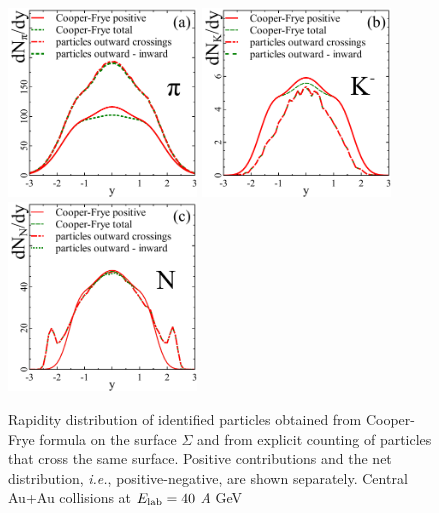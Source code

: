 \begin{figure}[htp]
\includegraphics[width=5cm]{plots/cooper_frye/E40pi.pdf}
\includegraphics[width=5cm]{plots/cooper_frye/E40Kmi.pdf}
\includegraphics[width=5cm]{plots/cooper_frye/E40N.pdf}
\caption{ Rapidity distribution of identified particles
  obtained from Cooper-Frye formula on the surface $\Sigma$ and from
  explicit counting of particles that cross the same surface. Positive
  contributions and the net distribution, \emph{i.e.},
  positive-negative, are shown separately. 
  Central Au+Au collisions at $E_\mathrm{lab} = 40$ \emph{A} GeV}
\label{Fig:spectra}
\end{figure}

